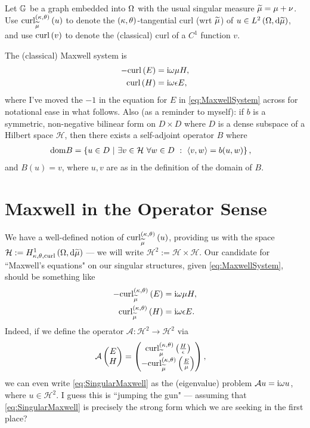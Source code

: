 \documentclass[11pt]{report}
\renewcommand{\curl}[1]{\mathrm{curl}\bracs{#1}}
\renewcommand{\ktcurl}[1]{\mathrm{curl}^{\kt}_{\dddmes}\bracs{#1}}
\newcommand{\hone}{\mathcal{H}}
\newcommand{\ip}[2]{\left\langle #1 , #2 \right\rangle}
\newcommand{\aop}{\mathcal{A}}
\begin{document}
Let $\mathbb{G}$ be a graph embedded into $\Omega$ with the usual singular measure $\widetilde{\mu} = \mu + \nu$.
Use $\ktcurl{u}$ to denote the $\left( \kappa, \theta \right)$-tangential curl (wrt $\widetilde{\mu}$) of $u\in L^{2}\left( \Omega,\mathrm{d}\widetilde{\mu} \right)$, and use $\curl{v}$ to denote the (classical) curl of a $C^1$ function $v$.

The (classical) Maxwell system is
\begin{subequations} \label{eq:MaxwellSystem}
	\begin{align} 
		- \curl{E} &= \rmi\omega\mu H, \\
		\curl{H} &= \rmi\omega\epsilon E,
	\end{align}
\end{subequations}
where I've moved the $-1$ in the equation for $E$ in \eqref{eq:MaxwellSystem} across for notational ease in what follows.
Also (as a reminder to myself): if $b$ is a symmetric, non-negative bilinear form on $D\times D$ where $D$ is a dense subspace of a Hilbert space $\hone$, then there exists a self-adjoint operator $B$ where
\begin{align*}
	\mathrm{dom}B &= \clbracs{u\in D \setVert \exists v\in\hone \ \forall w\in D \ : \ \ip{v}{w} = b(u,w)}, 
\end{align*}
and $B(u)= v$, where $u,v$ are as in the definition of the domain of $B$.

\section*{Maxwell in the Operator Sense}
We have a well-defined notion of $\ktcurl{u}$, providing us with the space $\hone := \ktcurlSob{\ddom}{\dddmes}$ --- we will write $\hone^2 := \hone\times\hone$.
Our candidate for ``Maxwell's equations" on our singular structures, given \eqref{eq:MaxwellSystem}, should be something like
\begin{subequations} \label{eq:SingularMaxwell}
	\begin{align} 
		- \ktcurl{E} &= \rmi\omega\mu H, \\
		\ktcurl{H} &= \rmi\omega\epsilon E.
	\end{align}
\end{subequations}
Indeed, if we define the operator $\aop: \hone^2 \rightarrow \hone^2$ via
\begin{align*}
	\aop \begin{pmatrix} E \\ H \end{pmatrix} 
	&= \begin{pmatrix} \ktcurl{\frac{H}{\epsilon}} \\ -\ktcurl{\frac{E}{\mu}} \end{pmatrix},
\end{align*}
we can even write \eqref{eq:SingularMaxwell} as the (eigenvalue) problem $\aop u = \rmi\omega u$, where $u\in\hone^2$.
I guess this is ``jumping the gun" --- assuming that \eqref{eq:SingularMaxwell} is precisely the strong form which we are seeking in the first place? \newline
\end{document}
